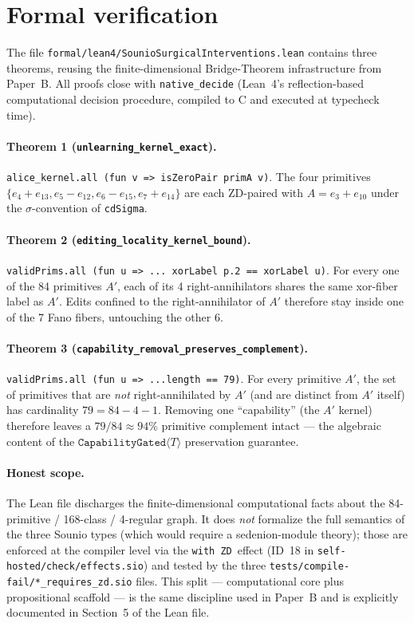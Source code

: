\documentclass{article}
\newcommand{\CapabilityGated}[1]{\texttt{CapabilityGated}\langle #1 \rangle}
\newcommand{\withZD}{\texttt{with ZD}}
\begin{document}
\section{Formal verification}

The file \texttt{formal/lean4/SounioSurgicalInterventions.lean} contains
three theorems, reusing the finite-dimensional Bridge-Theorem infrastructure
from Paper~B.  All proofs close with \texttt{native\_decide} (Lean~4's
reflection-based computational decision procedure, compiled to C and
executed at typecheck time).

\paragraph{Theorem 1 (\texttt{unlearning\_kernel\_exact}).}
\texttt{alice\_kernel.all (fun v => isZeroPair primA v)}.  The four
primitives $\{e_4+e_{13}, e_5-e_{12}, e_6-e_{15}, e_7+e_{14}\}$ are each
ZD-paired with $A = e_3 + e_{10}$ under the $\sigma$-convention of
\texttt{cdSigma}.

\paragraph{Theorem 2 (\texttt{editing\_locality\_kernel\_bound}).}
\texttt{validPrims.all (fun u => ... xorLabel p.2 == xorLabel u)}.  For
every one of the 84 primitives $A'$, each of its 4 right-annihilators
shares the same xor-fiber label as $A'$.  Edits confined to the
right-annihilator of $A'$ therefore stay inside one of the 7 Fano
fibers, untouching the other 6.

\paragraph{Theorem 3 (\texttt{capability\_removal\_preserves\_complement}).}
\texttt{validPrims.all (fun u => ...length == 79)}.  For every primitive
$A'$, the set of primitives that are \emph{not} right-annihilated by $A'$
(and are distinct from $A'$ itself) has cardinality $79 = 84 - 4 - 1$.
Removing one ``capability'' (the $A'$ kernel) therefore leaves a
$79/84 \approx 94\%$ primitive complement intact --- the algebraic
content of the $\CapabilityGated{T}$ preservation guarantee.

\paragraph{Honest scope.}  The Lean file discharges the finite-dimensional
computational facts about the 84-primitive / 168-class / 4-regular graph.
It does \emph{not} formalize the full semantics of the three Sounio types
(which would require a sedenion-module theory); those are enforced at the
compiler level via the \withZD~effect (ID~18 in
\texttt{self-hosted/check/effects.sio}) and tested by the three
\texttt{tests/compile-fail/*\_requires\_zd.sio} files.  This split --- 
computational core plus propositional scaffold --- is the same discipline
used in Paper~B and is explicitly documented in Section~5 of the Lean
file.
\end{document}
